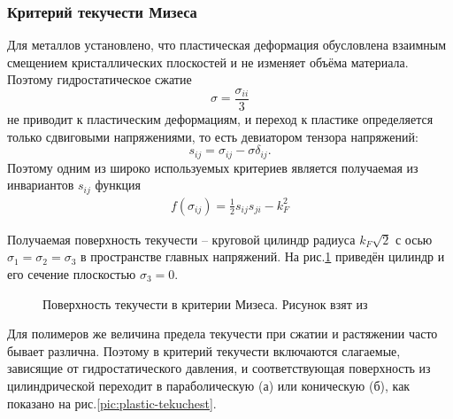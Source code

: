 \subsubsection{Критерий текучести Мизеса}
Для металлов установлено, что пластическая деформация обусловлена взаимным смещением кристаллических плоскостей и не изменяет объёма материала. Поэтому гидростатическое сжатие $$\sigma = \frac{\sigma_{ii}}{3}$$ не приводит к пластическим деформациям, и переход к пластике определяется только сдвиговыми напряжениями, то есть девиатором тензора напряжений: $$s_{ij} = \sigma_{ij} - \sigma\delta_{ij}.$$ Поэтому одним из широко используемых критериев является получаемая из инвариантов $s_{ij}$ функция
\begin{eqnarray}
\label{mizes}
f(\sigma_{ij}) = \frac{1}{2}s_{ij}s_{ji} - k^2_F
\end{eqnarray}

Получаемая поверхность текучести -- круговой цилиндр радиуса $k_F\sqrt{2}$ с осью $\sigma_1 = \sigma_2 = \sigma_3$ в пространстве главных напряжений. На рис.\ref{pic:mizes} приведён цилиндр и его сечение плоскостью $\sigma_3 = 0$.

\begin{figure}[h]
\caption{Поверхность текучести в критерии Мизеса. Рисунок взят из \cite{resler}}
\label{pic:mizes}
\end{figure}

Для полимеров же величина предела текучести при сжатии и растяжении часто бывает различна. Поэтому в критерий текучести включаются слагаемые, зависящие от гидростатического давления, и соответствующая поверхность из цилиндрической переходит в параболическую (а) или коническую (б), как показано на рис.\ref{pic:plastic-tekuchest}.

